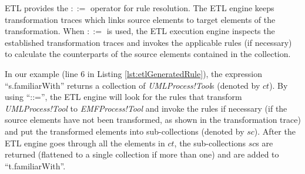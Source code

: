 


ETL provides the $::=$ operator for rule resolution. The ETL 
engine keeps transformation traces which links source elements to target 
elements of the transformation. 
When $::=$ is used, the ETL execution engine inspects the established 
transformation traces and invokes the applicable rules (if necessary) to 
calculate the counterparts of the source elements contained in the collection. 


In our example (line 6 in Listing \ref{lst:etlGeneratedRule}), the expression 
``s.familiarWith'' returns a collection of \emph{UMLProcess!Tool}s (denoted by $ct$). By 
using ``::='', the ETL engine will look for the rules that transform 
\emph{UMLProcess!Tool} to \emph{EMFProcess!Tool} and invoke the rules if 
necessary (if the source elements have not been transformed, as shown in the 
transformation trace) and put the transformed elements into sub-collections 
(denoted by $sc$). After the ETL engine goes through all the elements in $ct$, 
the sub-collections $sc$s are returned (flattened to a single collection if 
more than one) and are added to ``t.familiarWith''.

